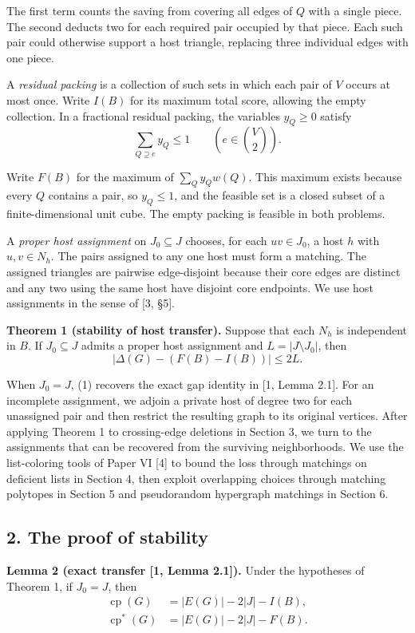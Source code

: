 \documentclass[english,11pt,a4paper]{article}
\begin{document}
The first term counts the saving from covering all edges of \(Q\) with a single piece. The second deducts two for each required pair occupied by that piece. Each such pair could otherwise support a host triangle, replacing three individual edges with one piece.

A \emph{residual packing} is a collection of such sets in which each pair of \(V\) occurs at most once. Write \(I(B)\) for its maximum total score, allowing the empty collection. In a fractional residual packing, the variables \(y_Q\ge0\) satisfy
\[
\sum_{Q\supseteq e}y_Q\le1 \qquad \left(e\in\binom{V}{2}\right).
\]

Write \(F(B)\) for the maximum of \(\sum_Q y_Qw(Q)\). This maximum exists because every \(Q\) contains a pair, so \(y_Q\le1\), and the feasible set is a closed subset of a finite-dimensional unit cube. The empty packing is feasible in both problems.

A \emph{proper host assignment} on \(J_0\subseteq J\) chooses, for each \(uv\in J_0\), a host \(h\) with \(u,v\in N_h\). The pairs assigned to any one host must form a matching. The assigned triangles are pairwise edge-disjoint because their core edges are distinct and any two using the same host have disjoint core endpoints. We use host assignments in the sense of {[}3, §5{]}.

\textbf{Theorem 1 (stability of host transfer).} Suppose that each \(N_h\) is independent in \(B\). If \(J_0\subseteq J\) admits a proper host assignment and \(L=|J\setminus J_0|\), then
\[
\big|\Delta(G)-(F(B)-I(B))\big|\le 2L. \tag{1}
\]

When \(J_0=J\), (1) recovers the exact gap identity in {[}1, Lemma 2.1{]}. For an incomplete assignment, we adjoin a private host of degree two for each unassigned pair and then restrict the resulting graph to its original vertices. After applying Theorem 1 to crossing-edge deletions in Section 3, we turn to the assignments that can be recovered from the surviving neighborhoods. We use the list-coloring tools of Paper VI {[}4{]} to bound the loss through matchings on deficient lists in Section 4, then exploit overlapping choices through matching polytopes in Section 5 and pseudorandom hypergraph matchings in Section 6.

\subsection{2. The proof of stability}\label{the-proof-of-stability}

\textbf{Lemma 2 (exact transfer {[}1, Lemma 2.1{]}).} Under the hypotheses of Theorem 1, if \(J_0=J\), then
\[
\begin{aligned}
\operatorname{cp}(G)   &= |E(G)|-2|J|-I(B),\\
\operatorname{cp}^{\ast}(G) &= |E(G)|-2|J|-F(B).
\end{aligned} \tag{2}
\]
\end{document}
